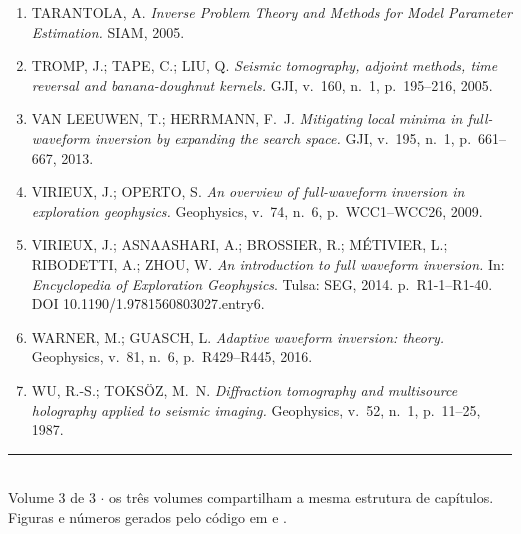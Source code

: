 \documentclass[11pt,a4paper,oneside]{report}
\begin{document}
\begin{enumerate}[leftmargin=*, itemsep=3pt]
\item TARANTOLA, A. \emph{Inverse Problem Theory and Methods for Model
Parameter Estimation.} SIAM, 2005.

\item TROMP, J.; TAPE, C.; LIU, Q. \emph{Seismic tomography, adjoint methods,
time reversal and banana-doughnut kernels.} GJI, v.~160, n.~1, p.~195--216,
2005.

\item VAN LEEUWEN, T.; HERRMANN, F.~J. \emph{Mitigating local minima in
full-waveform inversion by expanding the search space.} GJI, v.~195, n.~1,
p.~661--667, 2013.

\item VIRIEUX, J.; OPERTO, S. \emph{An overview of full-waveform inversion in
exploration geophysics.} Geophysics, v.~74, n.~6, p.~WCC1--WCC26, 2009.

\item VIRIEUX, J.; ASNAASHARI, A.; BROSSIER, R.; M\'ETIVIER, L.; RIBODETTI,
A.; ZHOU, W. \emph{An introduction to full waveform inversion.} In:
\emph{Encyclopedia of Exploration Geophysics}. Tulsa: SEG, 2014.
p.~R1-1--R1-40. DOI 10.1190/1.9781560803027.entry6.

\item WARNER, M.; GUASCH, L. \emph{Adaptive waveform inversion: theory.}
Geophysics, v.~81, n.~6, p.~R429--R445, 2016.

\item WU, R.-S.; TOKS\"OZ, M.~N. \emph{Diffraction tomography and multisource
holography applied to seismic imaging.} Geophysics, v.~52, n.~1, p.~11--25,
1987.
\end{enumerate}

\vfill
\begin{center}
{\color{cianofwi}\rule{0.55\textwidth}{1pt}}\\[0.35cm]
{\small Volume 3 de 3 $\cdot$ os tr\^es volumes compartilham a mesma estrutura
de cap\'itulos.\\
Figuras e n\'umeros gerados pelo c\'odigo em  e .}
\end{center}
\end{document}
